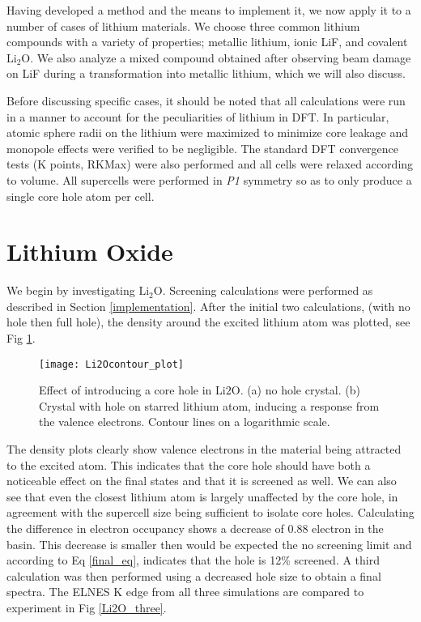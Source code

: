
Having developed a method and the means to implement it, we now apply it to a number of cases of lithium materials.   We choose three common lithium compounds with a variety of properties; metallic lithium, ionic LiF, and covalent $\mathrm{Li_2O}$.  We also analyze a mixed compound obtained after observing beam damage on LiF during a transformation into metallic lithium, which we will also discuss.  

Before discussing specific cases, it should be noted that all calculations were run in a manner to account for the peculiarities of lithium in DFT. In particular, atomic sphere radii on the lithium were maximized to minimize core leakage and monopole effects were verified to be negligible.  The standard DFT convergence tests (K points, RKMax) were also performed and all cells were relaxed according to volume.  All supercells were performed in \textit{P1} symmetry so as to only produce a single core hole atom per cell.  

\section{Lithium Oxide}

We begin by investigating $ \mathrm{Li_2O} $. Screening calculations were performed as described in Section \ref{implementation}.   After the initial two calculations, (with no hole then full hole), the density around the excited lithium atom was plotted, see Fig \ref{Li2O_contour}.  

\begin{figure}
	\centering
	\texttt{[image: Li2Ocontour\_plot]}
	\caption{Effect of introducing a core hole in $ \mathrm{Li2O} $.  (a) no hole crystal.  (b) Crystal with hole on starred lithium atom, inducing a response from the valence electrons.  Contour lines on a logarithmic scale. }
	\label{Li2O_contour}
\end{figure}

The density plots clearly show valence electrons in the material being attracted to the excited atom. This indicates that the core hole should have both a noticeable effect on the final states and that it is screened as well.  We can also see that even the closest lithium atom is largely unaffected by the core hole, in agreement with the supercell size being sufficient to isolate core holes.  Calculating the difference in electron occupancy shows a decrease of 0.88 electron in the basin.  This decrease is smaller then would be expected the no screening limit and according to Eq \ref{final_eq}, indicates that the hole is 12\% screened.  A third calculation was then performed using a decreased hole size to obtain a final spectra.  The ELNES K edge from all three simulations are compared to experiment in Fig \ref{Li2O_three}.  

